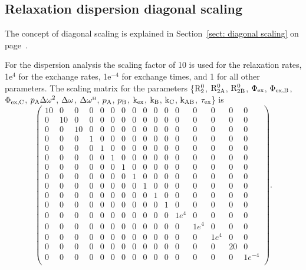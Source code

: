 
\subsection{Relaxation dispersion diagonal scaling}

The concept of diagonal scaling is explained in Section~\ref{sect: diagonal scaling} on page~\pageref{sect: diagonal scaling}.

For the dispersion analysis the scaling factor of 10 is used for the relaxation rates, 1e$^4$ for the exchange rates, 1e$^{-4}$ for exchange times, and 1 for all other parameters.
The scaling matrix for the parameters \{$\mathrm{R}_2^0$, $\mathrm{R}_{\mathrm{2A}}^0$, $\mathrm{R}_{\mathrm{2B}}^0$, $\Phi_{\textrm{ex}}$, $\Phi_{\textrm{ex,B}}$, $\Phi_{\textrm{ex,C}}$, $p_{\textrm{A}}\Delta\omega^2$, $\Delta\omega$, $\Delta\omega^{\scriptscriptstyle\mathrm{H}}$, $p_{\textrm{A}}$, $p_{\textrm{B}}$, $\textrm{k}_{\textrm{ex}}$, $\textrm{k}_{\textrm{B}}$, $\textrm{k}_{\textrm{C}}$, $\textrm{k}_{\textrm{AB}}$, $\tau_{\textrm{ex}}$\} is
\begin{equation}
    \begin{pmatrix}
        10 & 0  & 0  & 0 & 0 & 0 & 0 & 0 & 0 & 0 & 0 & 0    & 0    & 0    & 0    & 0       \\
        0  & 10 & 0  & 0 & 0 & 0 & 0 & 0 & 0 & 0 & 0 & 0    & 0    & 0    & 0    & 0       \\
        0  & 0  & 10 & 0 & 0 & 0 & 0 & 0 & 0 & 0 & 0 & 0    & 0    & 0    & 0    & 0       \\
        0  & 0  & 0  & 1 & 0 & 0 & 0 & 0 & 0 & 0 & 0 & 0    & 0    & 0    & 0    & 0       \\
        0  & 0  & 0  & 0 & 1 & 0 & 0 & 0 & 0 & 0 & 0 & 0    & 0    & 0    & 0    & 0       \\
        0  & 0  & 0  & 0 & 0 & 1 & 0 & 0 & 0 & 0 & 0 & 0    & 0    & 0    & 0    & 0       \\
        0  & 0  & 0  & 0 & 0 & 0 & 1 & 0 & 0 & 0 & 0 & 0    & 0    & 0    & 0    & 0       \\
        0  & 0  & 0  & 0 & 0 & 0 & 0 & 1 & 0 & 0 & 0 & 0    & 0    & 0    & 0    & 0       \\
        0  & 0  & 0  & 0 & 0 & 0 & 0 & 0 & 1 & 0 & 0 & 0    & 0    & 0    & 0    & 0       \\
        0  & 0  & 0  & 0 & 0 & 0 & 0 & 0 & 0 & 1 & 0 & 0    & 0    & 0    & 0    & 0       \\
        0  & 0  & 0  & 0 & 0 & 0 & 0 & 0 & 0 & 0 & 1 & 0    & 0    & 0    & 0    & 0       \\
        0  & 0  & 0  & 0 & 0 & 0 & 0 & 0 & 0 & 0 & 0 & 1e^4 & 0    & 0    & 0    & 0       \\
        0  & 0  & 0  & 0 & 0 & 0 & 0 & 0 & 0 & 0 & 0 & 0    & 1e^4 & 0    & 0    & 0       \\
        0  & 0  & 0  & 0 & 0 & 0 & 0 & 0 & 0 & 0 & 0 & 0    & 0    & 1e^4 & 0    & 0       \\
        0  & 0  & 0  & 0 & 0 & 0 & 0 & 0 & 0 & 0 & 0 & 0    & 0    & 0    & 20   & 0       \\
        0  & 0  & 0  & 0 & 0 & 0 & 0 & 0 & 0 & 0 & 0 & 0    & 0    & 0    & 0    & 1e^{-4} \\
    \end{pmatrix}.
\end{equation}


